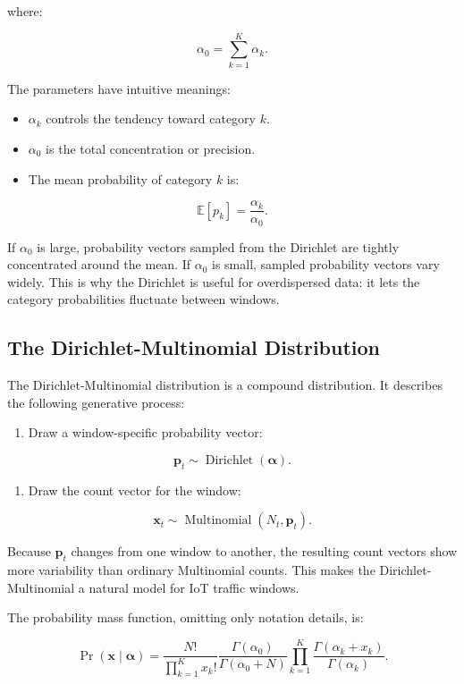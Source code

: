 \documentclass[11pt,a4paper]{article}
\begin{document}
where:

\[
\alpha_0 = \sum_{k=1}^{K}\alpha_k.
\]

The parameters have intuitive meanings:

\begin{itemize}
  \item \(\alpha_k\) controls the tendency toward category \(k\).
  \item \(\alpha_0\) is the total concentration or precision.
  \item The mean probability of category \(k\) is:
\end{itemize}

\[
\mathbb{E}[p_k]=\frac{\alpha_k}{\alpha_0}.
\]

If \(\alpha_0\) is large, probability vectors sampled from the Dirichlet are tightly concentrated around the mean. If \(\alpha_0\) is small, sampled probability vectors vary widely. This is why the Dirichlet is useful for overdispersed data: it lets the category probabilities fluctuate between windows.

\subsection{The Dirichlet-Multinomial Distribution}

The Dirichlet-Multinomial distribution is a compound distribution. It describes the following generative process:

\begin{enumerate}
  \item Draw a window-specific probability vector:
\end{enumerate}

\[
\mathbf{p}_t \sim \operatorname{Dirichlet}(\boldsymbol{\alpha}).
\]

\begin{enumerate}[resume]
  \item Draw the count vector for the window:
\end{enumerate}

\[
\mathbf{x}_t \sim \operatorname{Multinomial}(N_t,\mathbf{p}_t).
\]

Because \(\mathbf{p}_t\) changes from one window to another, the resulting count vectors show more variability than ordinary Multinomial counts. This makes the Dirichlet-Multinomial a natural model for IoT traffic windows.

The probability mass function, omitting only notation details, is:

\[
\Pr(\mathbf{x}\mid\boldsymbol{\alpha})
=
\frac{N!}{\prod_{k=1}^{K}x_k!}
\frac{\Gamma(\alpha_0)}{\Gamma(\alpha_0+N)}
\prod_{k=1}^{K}
\frac{\Gamma(\alpha_k+x_k)}{\Gamma(\alpha_k)}.
\]
\end{document}
